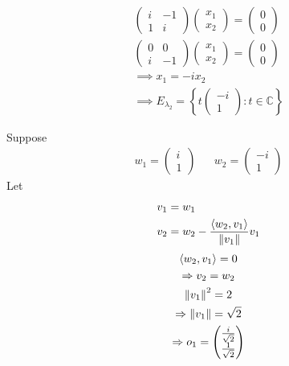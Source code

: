 \begin{enumerate}
\begin{itemize}
\begin{gather}
\begin{pmatrix}
i & -1\\
1 & i
\end{pmatrix}
\begin{pmatrix}
x_1\\x_2
\end{pmatrix}
=
\begin{pmatrix}
0\\0
\end{pmatrix}\\
\begin{pmatrix}
0 & 0\\
i & -1
\end{pmatrix}
\begin{pmatrix}
x_1\\x_2
\end{pmatrix}
=
\begin{pmatrix}
0\\0
\end{pmatrix}\\
\implies x_1 = -ix_2\\
\implies E_{\lambda_2} =
\left\{t\begin{pmatrix}-i\\1\end{pmatrix}\colon t \in \mathbb{C}\right\}
\end{gather}
\end{itemize}
Suppose
\begin{align}
w_1 = \begin{pmatrix}i\\1\end{pmatrix} & & w_2 = \begin{pmatrix}-i\\1\end{pmatrix}
\end{align}
Let
\begin{align}
v_1 &= w_1\\
v_2 &= w_2 -\frac{\langle w_2,v_1\rangle}{\left\lVert v_1\right\rVert}v_1
\end{align}
\begin{gather}
\langle w_2,v_1 \rangle = 0\\
\implies v_2 = w_2\\
\norm{v_1}^2 = 2\\
\implies \norm{v_1} = \sqrt{2}\\
\implies o_1
= \begin{pmatrix}\frac{i}{\sqrt{2}}\\\frac{1}{\sqrt{2}}\end{pmatrix}\\

\end{gather}
\end{enumerate}
